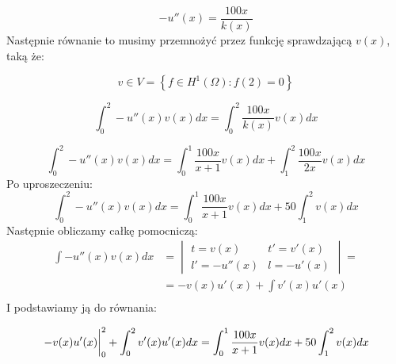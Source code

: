 \documentclass[12pt]{article}
\begin{document}
\begin{equation}
    -u''(x) = \frac{100x}{k(x)}
\end{equation}
% 
Następnie równanie to musimy przemnożyć przez funkcję sprawdzającą $v(x)$, taką że:

\begin{equation}
    v \in V = \left\{f \in H^1(\Omega) : f(2) = 0 \right\}
\end{equation}
% 

\begin{equation}
    \int_{0}^{2} -u''(x) v(x) dx = \int_{0}^{2} \frac{100x}{k(x)} v(x) dx
\end{equation}
% 

\begin{equation}
    \int_{0}^{2} -u''(x) v(x) dx 
    = \int_{0}^{1} \frac{100x}{x+1} v(x) dx
    + \int_{1}^{2} \frac{100x}{2x} v(x) dx
\end{equation}
% 
Po uproszeczeniu:
\begin{equation}
    \int_{0}^{2} -u''(x) v(x) dx 
    = \int_{0}^{1} \frac{100x}{x+1} v(x) dx
    + 50\int_{1}^{2} v(x) dx
\end{equation}
% 
Następnie obliczamy całkę pomocniczą:
\begin{equation}
    \begin{split}
        \int -u''(x) v(x) dx 
        & = \begin{vmatrix}
            t = v(x) & t' = v'(x) \\
            l' = -u''(x) & l = -u'(x)
        \end{vmatrix} = \\
        & = -v(x)u'(x) + \int v'(x) u'(x) \\
    \end{split}
\end{equation}
% 
I podstawiamy ją do równania:

\begin{equation}
    \eval{-v(x)u'(x)}_0^2 
    + \int_0^2 v'(x) u'(x) dx
    = \int_{0}^{1} \frac{100x}{x+1} v(x) dx
    + 50\int_{1}^{2} v(x) dx
\end{equation}
\end{document}

